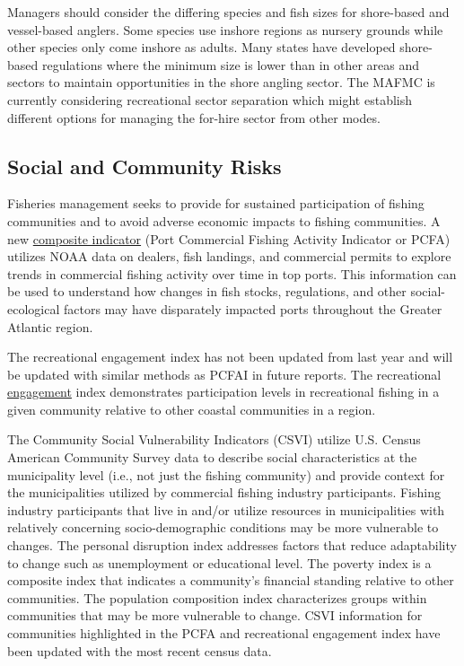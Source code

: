 \documentclass[
  10pt,
]{article}
\begin{document}
Managers should consider the differing species and fish sizes for
shore-based and vessel-based anglers. Some species use inshore regions
as nursery grounds while other species only come inshore as adults. Many
states have developed shore-based regulations where the minimum size is
lower than in other areas and sectors to maintain opportunities in the
shore angling sector. The MAFMC is currently considering recreational
sector separation which might establish different options for managing
the for-hire sector from other modes.

\subsection{Social and Community
Risks}\label{social-and-community-risks}

Fisheries management seeks to provide for sustained participation of
fishing communities and to avoid adverse economic impacts to fishing
communities. A new
\href{https://noaa-edab.github.io/catalog/engagement.html?q=engage\#introduction-to-indicator-72}{composite
indicator} (Port Commercial Fishing Activity Indicator or PCFA) utilizes
NOAA data on dealers, fish landings, and commercial permits to explore
trends in commercial fishing activity over time in top ports. This
information can be used to understand how changes in fish stocks,
regulations, and other social-ecological factors may have disparately
impacted ports throughout the Greater Atlantic region.

The recreational engagement index has not been updated from last year
and will be updated with similar methods as PCFAI in future reports. The
recreational
\href{https://noaa-edab.github.io/catalog/engagement.html}{engagement}
index demonstrates participation levels in recreational fishing in a
given community relative to other coastal communities in a region.

The Community Social Vulnerability Indicators (CSVI) utilize U.S. Census
American Community Survey data to describe social characteristics at the
municipality level (i.e., not just the fishing community) and provide
context for the municipalities utilized by commercial fishing industry
participants. Fishing industry participants that live in and/or utilize
resources in municipalities with relatively concerning socio-demographic
conditions may be more vulnerable to changes. The personal disruption
index addresses factors that reduce adaptability to change such as
unemployment or educational level. The poverty index is a composite
index that indicates a community's financial standing relative to other
communities. The population composition index characterizes groups
within communities that may be more vulnerable to change. CSVI
information for communities highlighted in the PCFA and recreational
engagement index have been updated with the most recent census data.
\end{document}
